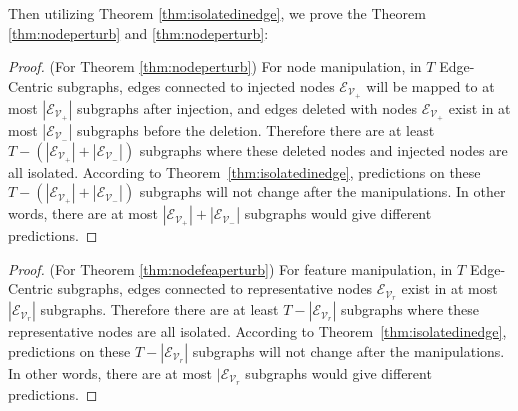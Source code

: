Then utilizing Theorem \ref{thm:isolatedinedge}, we prove the Theorem \ref{thm:nodeperturb} and \ref{thm:nodeperturb}:
\begin{proof}(For Theorem \ref{thm:nodeperturb})
 For node manipulation, in $T$ Edge-Centric subgraphs, edges connected to injected nodes $\mathcal{E}_{\mathcal{V}_+}$ will be mapped to at most $|\mathcal{E}_{\mathcal{V}_+}|$ subgraphs after injection, and edges deleted with nodes $\mathcal{E}_{\mathcal{V}_+}$ exist in at most $|\mathcal{E}_{\mathcal{V}_-}|$ subgraphs before the deletion. Therefore there are at least $T-(|\mathcal{E}_{\mathcal{V}_+}|+|\mathcal{E}_{\mathcal{V}_-}|)$ subgraphs where these deleted nodes and injected nodes are all isolated. According to Theorem~\ref{thm:isolatedinedge}, predictions on these $T-(|\mathcal{E}_{\mathcal{V}_+}|+|\mathcal{E}_{\mathcal{V}_-}|)$ subgraphs will not change after the manipulations. In other words, there are at most $|\mathcal{E}_{\mathcal{V}_+}|+|\mathcal{E}_{\mathcal{V}_-}|$ subgraphs would give different predictions. 
\end{proof}
\begin{proof}(For Theorem \ref{thm:nodefeaperturb})
 For feature manipulation, in $T$ Edge-Centric subgraphs, edges connected to representative nodes $\mathcal{E}_{\mathcal{V}_r}$ exist in at most $|\mathcal{E}_{\mathcal{V}_r}|$ subgraphs. Therefore there are at least $T-|\mathcal{E}_{\mathcal{V}_r}|$ subgraphs where these representative nodes are all isolated. According to Theorem~\ref{thm:isolatedinedge}, predictions on these $T-|\mathcal{E}_{\mathcal{V}_r}|$ subgraphs will not change after the manipulations. In other words, there are at most $|\mathcal{E}_{\mathcal{V}_r}$ subgraphs would give different predictions. 
\end{proof}



